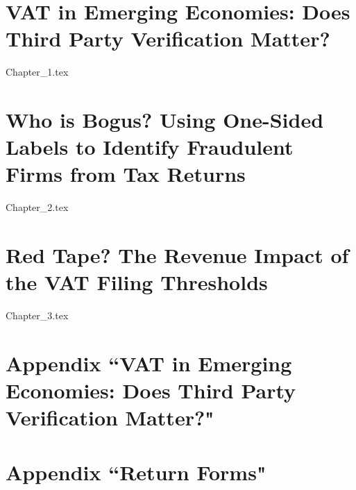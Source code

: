 \documentclass[PhD, final]{uclathes}
\begin{document}
\makeintropages

\chapter{VAT in Emerging Economies: Does Third Party Verification Matter?}
 {Chapter_1.tex} 


\chapter{Who is Bogus? Using One-Sided Labels to Identify Fraudulent Firms from Tax Returns}
 {Chapter_2.tex}                         %

\chapter{Red Tape? The Revenue Impact of the VAT Filing Thresholds}
 {Chapter_3.tex}                         %

\appendix
\chapter{Appendix ``VAT in Emerging Economies: Does Third Party Verification Matter?"}


\chapter{Appendix ``Return Forms"}


\newpage
{}


\end{document}
